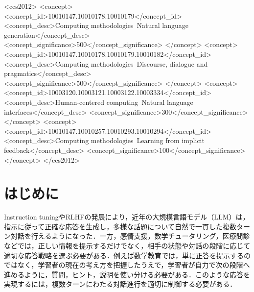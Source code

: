 \documentclass[manuscript,review,anonymous]{acmart}
\begin{document}
\begin{CCSXML}
<ccs2012>
 <concept>
  <concept_id>10010147.10010178.10010179</concept_id>
  <concept_desc>Computing methodologies~Natural language generation</concept_desc>
  <concept_significance>500</concept_significance>
 </concept>
 <concept>
  <concept_id>10010147.10010178.10010179.10010182</concept_id>
  <concept_desc>Computing methodologies~Discourse, dialogue and pragmatics</concept_desc>
  <concept_significance>500</concept_significance>
 </concept>
 <concept>
  <concept_id>10003120.10003121.10003122.10003334</concept_id>
  <concept_desc>Human-centered computing~Natural language interfaces</concept_desc>
  <concept_significance>300</concept_significance>
 </concept>
 <concept>
  <concept_id>10010147.10010257.10010293.10010294</concept_id>
  <concept_desc>Computing methodologies~Learning from implicit feedback</concept_desc>
  <concept_significance>100</concept_significance>
 </concept>
</ccs2012>
\end{CCSXML}



\maketitle


\section{はじめに}
\label{sec:intro}

Instruction tuningやRLHFの発展により，近年の大規模言語モデル（LLM）は，指示に従って正確な応答を生成し，多様な話題について自然で一貫した複数ターン対話を行えるようになった\cite{ouyang2022instructgpt}．一方，感情支援，数学チュータリング，医療問診などでは，正しい情報を提示するだけでなく，相手の状態や対話の段階に応じて適切な応答戦略を選ぶ必要がある\cite{rashkin2019empathetic,liu2021esconv}．例えば数学教育では，単に正答を提示するのではなく，学習者の現在の考え方を把握したうえで，学習者が自力で次の段階へ進めるように，質問，ヒント，説明を使い分ける必要がある．このような応答を実現するには，複数ターンにわたる対話進行を適切に制御する必要がある．
\end{document}
